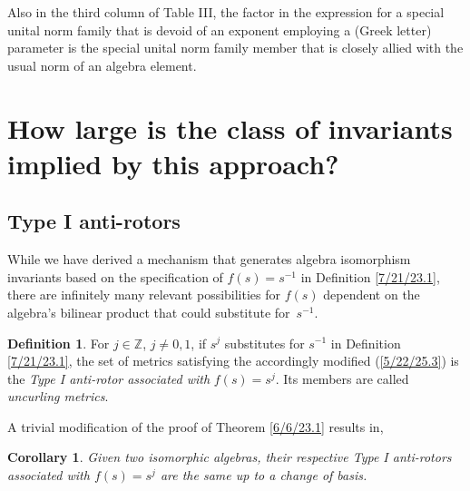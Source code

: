 \documentclass{amsart}
\newtheorem{corollary}[theorem]{Corollary}
\theoremstyle{definition}
\newtheorem{definition}[theorem]{Definition}
\numberwithin{theorem}{section}
\numberwithin{equation}{section}
\begin{document}
Also in the third column of Table III, the factor in the expression for a special unital norm family that is devoid of an exponent employing a (Greek letter) parameter is the special unital norm family member that is closely allied with the usual norm of an algebra element.

\section{How large is the class of invariants implied by this approach?}

\subsection{Type I anti-rotors}
While we have derived a mechanism that generates \mbox{algebra} isomorphism invariants based on the specification of $f(s)=s^{-1}$ in Definition  
\ref{7/21/23.1}, there are infinitely many relevant possibilities for $f(s)$ dependent on the algebra's bilinear product that could substitute \mbox{for $s^{-1}$}.

\begin{definition}\label{10/29/25.1}  For $j\in\mathbb{Z}$, $j\ne 0,1$, if $s^j$ substitutes for $s^{-1}$ in Definition  
\ref{7/21/23.1}, the set of metrics satisfying the accordingly modified (\ref{5/22/25.3}) is the {\it Type I anti-rotor associated with} $f(s)=s^j$.  Its members are called {\it uncurling metrics}. \end{definition}

A trivial modification of the proof of Theorem \ref{6/6/23.1} results in,

\begin{corollary}\label{10/29/25.2} Given two isomorphic algebras, their respective Type I anti-rotors associated with $f(s)=s^{j}$ are the same up to a change of basis. \end{corollary} 
\end{document}

